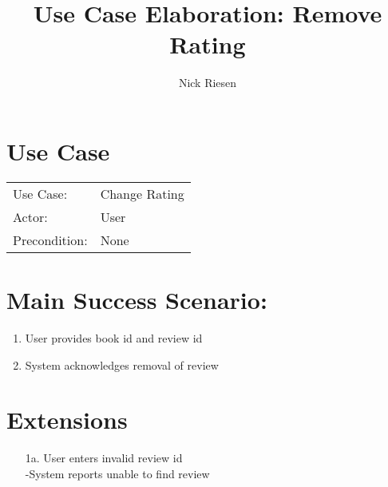 \documentclass{article}
\title{Use Case Elaboration: Remove Rating}
\author{ Nick Riesen }
\begin{document}
\maketitle


\section*{Use Case}
\begin{tabular}{l l}
Use Case:     & Change Rating                 \\
Actor:        & User                          \\
Precondition: & None                          \\
\end{tabular}


\section*{Main Success Scenario:}

\begin{enumerate}
    \item  User provides book id and review id
    \item System acknowledges removal of review

\end{enumerate}

\section*{Extensions}

\begin{itemize}
    \item [1a.] User enters invalid review id \\
        -System reports unable to find review

\end{itemize}
\end{document}
